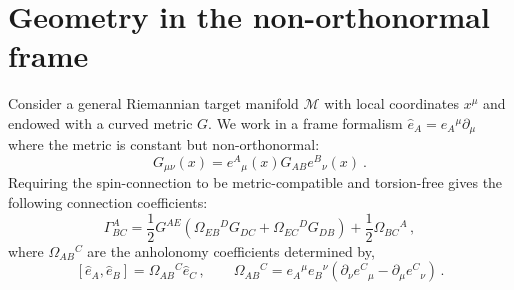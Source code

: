 \documentclass[12pt]{article}
\begin{document}
\section{Geometry in the non-orthonormal frame}\label{s:geometry}
Consider a general Riemannian target manifold $\mathcal{M}$ with local coordinates $x^{\mu}$ and endowed with a curved metric $G$. We work  in a frame formalism $\hat{e}_{A} = e_{A}{}^\mu \partial_\mu$ where the metric is constant but non-orthonormal:
\begin{equation}
G_{\mu\nu}(x) = e^{A}{}_\mu (x) G_{AB} e^{B}{}_\nu (x) \ . 
\end{equation}
 Requiring the spin-connection to be metric-compatible and torsion-free gives the following connection coefficients:
\begin{equation}\label{eq:conngeng}
\Gamma^{A}_{BC} = \frac{1}{2}G^{AE}\left(\Omega_{EB}{}^{D}G_{DC} + \Omega_{EC}{}^{D}G_{DB} \right) + \frac{1}{2}\Omega_{BC}{}^{A}\,,
\end{equation}
where $\Omega_{AB}{}^C$ are the anholonomy coefficients determined by,
\begin{equation}
\left[ \hat{e}_{A},\hat{e}_{B}\right] = \Omega_{AB}{}^{C}\hat{e}_C \,, \qquad  \Omega_{AB}{}^C = e_{A}{}^\mu e_{B}{}^\nu \left(\partial_\nu e^{C}{}_\mu -\partial_\mu e^{C}{}_\nu\right)\,.
\end{equation}
\end{document}
